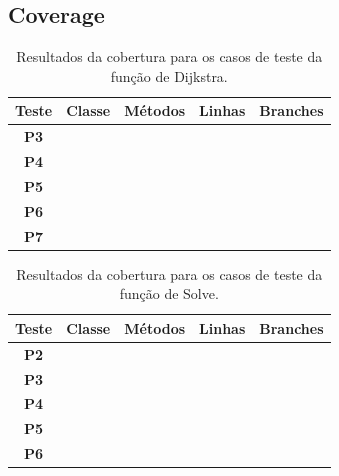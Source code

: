 \documentclass{article}
\begin{document}
\subsection{Coverage}

\begin{table}[H]
    \centering
    \renewcommand{\arraystretch}{1.8}
    \begin{tabular}{|c|p{4cm}|p{4cm}|c|c|} %
    \hline
    \textbf{Teste} & \textbf{Classe} & \textbf{Métodos} & \textbf{Linhas} & \textbf{Branches}\\ \hline
    \textbf{P3} &  & & & \\ \hline
    \textbf{P4} &  & & & \\ \hline
    \textbf{P5} &  & & & \\ \hline
    \textbf{P6} &  & & & \\ \hline
    \textbf{P7} &  & & & \\ \hline
    

\end{tabular}
\caption{Resultados da cobertura para os casos de teste da função de Dijkstra.}
\label{tab:tabela_exemplo}
\end{table}
 

\begin{table}[H]
    \centering
    \renewcommand{\arraystretch}{1.8}
    \begin{tabular}{|c|p{4cm}|p{4cm}|c|c|} %
    \hline
    \textbf{Teste} & \textbf{Classe} & \textbf{Métodos} & \textbf{Linhas} & \textbf{Branches}\\ \hline
    \textbf{P2} &  & & & \\ \hline
    \textbf{P3} &  & & & \\ \hline
    \textbf{P4} &  & & & \\ \hline
    \textbf{P5} &  & & & \\ \hline
    \textbf{P6} &  & & & \\ \hline
    
    

\end{tabular}
\caption{Resultados da cobertura para os casos de teste da função de Solve.}
\label{tab:tabela_exemplo}
\end{table}
\end{document}
